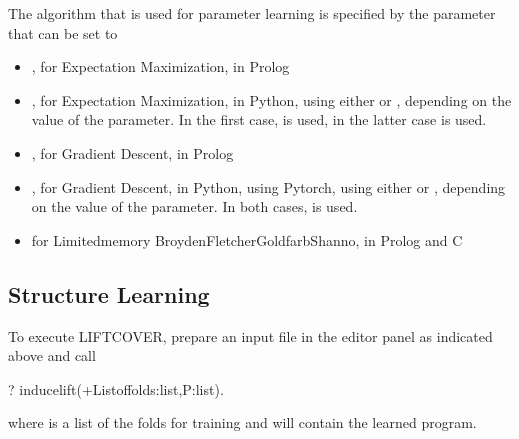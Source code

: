 \documentclass[letterpaper,10pt,english]{sphinxmanual}
\begin{document}
\sphinxAtStartPar
The algorithm that is used for parameter learning is specified by
the parameter  that can be set to
\begin{itemize}
\item {} 
\sphinxAtStartPar
{}, for Expectation Maximization, in Prolog

\item {} 
\sphinxAtStartPar
{}, for Expectation Maximization, in Python, using either  or , depending on the value of the  parameter. In the first case,  is used, in the latter case  is used.

\item {} 
\sphinxAtStartPar
{}, for Gradient Descent, in Prolog

\item {} 
\sphinxAtStartPar
{}, for Gradient Descent, in Python, using Pytorch, using either  or , depending on the value of the  parameter. In both cases,  is used.

\item {} 
\sphinxAtStartPar
{} for Limited\sphinxhyphen{}memory Broyden\sphinxhyphen{}Fletcher\sphinxhyphen{}Goldfarb\sphinxhyphen{}Shanno, in Prolog and C

\end{itemize}


\subsection{Structure Learning}
\label{\detokenize{index:structure-learning}}
\sphinxAtStartPar
To execute LIFTCOVER, prepare an input file in the editor panel as indicated above and call

\begin{sphinxVerbatim}[commandchars=\\\{\}]
?\PYGZhy{} induce\PYGZus{}lift(+List\PYGZus{}of\PYGZus{}folds:list,\PYGZhy{}P:list).
\end{sphinxVerbatim}

\sphinxAtStartPar
where  is a list of the folds for training and  will contain the learned program.
\end{document}
